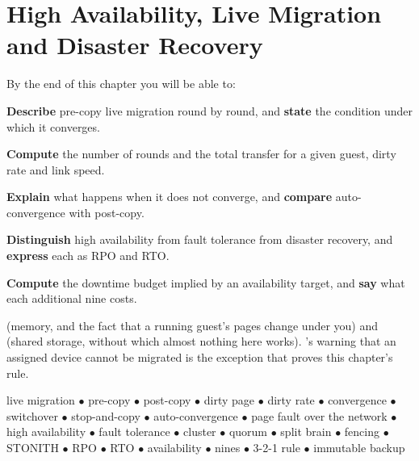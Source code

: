 \chapter{High Availability, Live Migration and Disaster Recovery}\label{ch:migration}

\begin{outcomes}
By the end of this chapter you will be able to:
\begin{tight}
  \item \textbf{Describe} pre-copy live migration round by round, and
        \textbf{state} the condition under which it converges.
  \item \textbf{Compute} the number of rounds and the total transfer for a
        given guest, dirty rate and link speed.
  \item \textbf{Explain} what happens when it does not converge, and
        \textbf{compare} auto-convergence with post-copy.
  \item \textbf{Distinguish} high availability from fault tolerance from
        disaster recovery, and \textbf{express} each as RPO and RTO.
  \item \textbf{Compute} the downtime budget implied by an availability target,
        and \textbf{say} what each additional nine costs.
\end{tight}
\end{outcomes}

\begin{prereq}
 (memory, and the fact that a running guest's pages change under
you) and  (shared storage, without which almost nothing here
works). 's warning that an assigned device cannot be migrated
is the exception that proves this chapter's rule.
\end{prereq}

\begin{keyterms}
live migration $\bullet$ pre-copy $\bullet$ post-copy $\bullet$ dirty page
$\bullet$ dirty rate $\bullet$ convergence $\bullet$ switchover $\bullet$
stop-and-copy $\bullet$ auto-convergence $\bullet$ page fault over the network
$\bullet$ high availability $\bullet$ fault tolerance $\bullet$ cluster
$\bullet$ quorum $\bullet$ split brain $\bullet$ fencing $\bullet$ STONITH
$\bullet$ RPO $\bullet$ RTO $\bullet$ availability $\bullet$ nines $\bullet$
3-2-1 rule $\bullet$ immutable backup
\end{keyterms}

